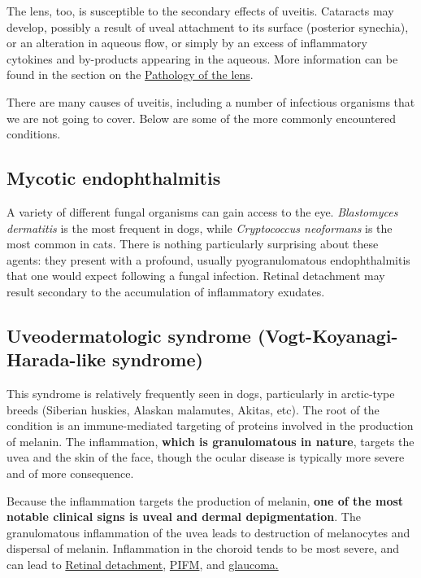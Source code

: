 \documentclass[openany]{article}
\begin{document}
The lens, too, is susceptible to the secondary effects of uveitis.
Cataracts may develop, possibly a result of uveal attachment to its
surface (posterior synechia), or an alteration in aqueous flow, or
simply by an excess of inflammatory cytokines and by-products appearing
in the aqueous. More information can be found in the section on the
\protect\hyperlink{pathology-of-the-lens}{Pathology of the lens}.

There are many causes of uveitis, including a number of infectious
organisms that we are not going to cover. Below are some of the more
commonly encountered conditions.

\subsection{Mycotic endophthalmitis}\label{mycotic-endophthalmitis}

A variety of different fungal organisms can gain access to the eye.
\emph{Blastomyces dermatitis} is the most frequent in dogs, while
\emph{Cryptococcus neoformans} is the most common in cats. There is
nothing particularly surprising about these agents: they present with a
profound, usually pyogranulomatous endophthalmitis that one would expect
following a fungal infection. Retinal detachment may result secondary to
the accumulation of inflammatory exudates.

\subsection{Uveodermatologic syndrome (Vogt-Koyanagi-Harada-like
syndrome)}\label{uveodermatologic-syndrome-vogt-koyanagi-harada-like-syndrome}

This syndrome is relatively frequently seen in dogs, particularly in
arctic-type breeds (Siberian huskies, Alaskan malamutes, Akitas, etc).
The root of the condition is an immune-mediated targeting of proteins
involved in the production of melanin. The inflammation, \textbf{which
is granulomatous in nature}, targets the uvea and the skin of the face,
though the ocular disease is typically more severe and of more
consequence.

Because the inflammation targets the production of melanin, \textbf{one
of the most notable clinical signs is uveal and dermal depigmentation}.
The granulomatous inflammation of the uvea leads to destruction of
melanocytes and dispersal of melanin. Inflammation in the choroid tends
to be most severe, and can lead to
\protect\hyperlink{retinal-detachment}{Retinal detachment},
\protect\hyperlink{pre-iridial-fibrovascular-membranes-pifm}{PIFM}, and
\protect\hyperlink{glaucoma}{glaucoma.}
\end{document}
